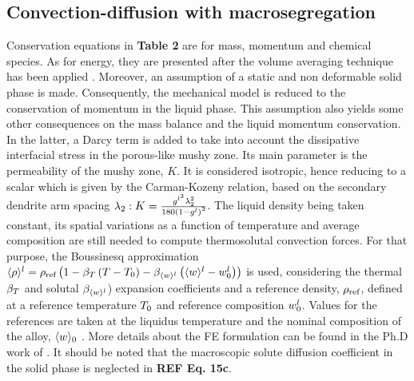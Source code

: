\subsection{Convection-diffusion with macrosegregation}
Conservation equations in \textbf{Table 2} are for mass, momentum and chemical species. 
As for energy, they are presented after the volume averaging technique has been applied 
\citep{ni_volume-averaged_1991, dantzig_solidification_2009}. Moreover, an assumption 
of a static and non deformable solid phase is made. Consequently, the mechanical model is 
reduced to the conservation of momentum in the liquid phase. This assumption also yields 
some other consequences on the mass balance and the liquid momentum conservation. In the 
latter, a Darcy term is added to take into account the dissipative interfacial stress in 
the porous-like mushy zone. Its main parameter is the permeability of the mushy zone, $K$. 
It is considered isotropic, hence reducing to a scalar which is given by the Carman-Kozeny 
relation, based on the secondary dendrite arm spacing $\lambda_2: K= \frac{g^{l^3}  \lambda_2^{2}
 }{180\left( 1-g^l \right)^2}$. The liquid density being taken constant, its spatial variations 
as a function of temperature and average composition are still needed to compute thermosolutal 
convection forces. For that purpose, the Boussinesq approximation $\langle  \rho  \rangle^l = \rho_{\text{ref}} \left( 1-\beta_T 
\left( T-T_{0} \right)-\beta_{\langle w \rangle^l} \left( \langle w \rangle^l-w_{0}^l \right) \right)$ is used, considering the thermal $\beta_T$ and solutal $\beta_{\langle w \rangle^l}$) expansion coefficients 
and a reference density, $\rho_{\text{ref}}$, defined at a reference temperature $T_{0}$ and reference 
composition $w_{0}^l$. Values for the references are taken at the liquidus temperature and the nominal 
composition of the alloy, $\langle w \rangle_0$ \citep{carozzani_direct_2013}. More details about the FE formulation can be found in 
the Ph.D work of \citet{rivaux_simulation_2011, carozzani_developpement_2012}. It should be noted that the macroscopic 
solute diffusion coefficient in the solid phase is neglected in \textbf{REF Eq. 15c}. 


